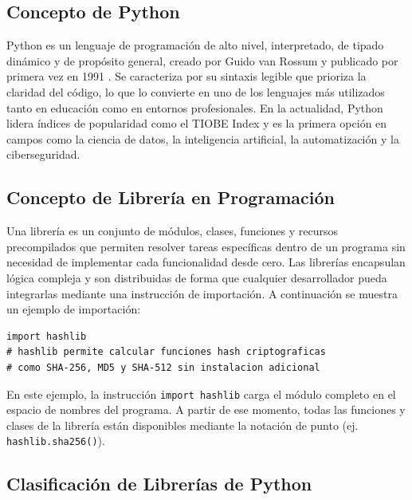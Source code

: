 \documentclass[12pt,a4paper]{article}
\begin{document}
\subsection{Concepto de Python}

Python es un lenguaje de programación de alto nivel, interpretado, de
tipado dinámico y de propósito general, creado por Guido van Rossum y
publicado por primera vez en 1991 \cite{vanrossum2009}. Se
caracteriza por su sintaxis legible que prioriza la claridad del código,
lo que lo convierte en uno de los lenguajes más utilizados tanto en
educación como en entornos profesionales. En la actualidad, Python
lidera índices de popularidad como el TIOBE Index y es la primera opción
en campos como la ciencia de datos, la inteligencia artificial, la
automatización y la ciberseguridad.

\subsection{Concepto de Librería en Programación}

Una librería es un conjunto de módulos, clases, funciones y recursos
precompilados que permiten resolver tareas específicas dentro de un
programa sin necesidad de implementar cada funcionalidad desde cero. Las
librerías encapsulan lógica compleja y son distribuidas de forma que
cualquier desarrollador pueda integrarlas mediante una instrucción de
importación. A continuación se muestra un ejemplo de importación:

\begin{lstlisting}[caption={Importación de la librería estándar hashlib en Python},
                   label=lst:import_hashlib]
import hashlib
# hashlib permite calcular funciones hash criptograficas
# como SHA-256, MD5 y SHA-512 sin instalacion adicional
\end{lstlisting}

En este ejemplo, la instrucción \texttt{import hashlib} carga el módulo
completo en el espacio de nombres del programa. A partir de ese momento,
todas las funciones y clases de la librería están disponibles mediante
la notación de punto (ej. \texttt{hashlib.sha256()}).

\subsection{Clasificación de Librerías de Python}
\end{document}
